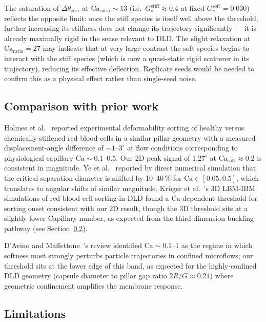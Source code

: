 \documentclass[11pt,a4paper]{article}
\begin{document}
The saturation of $\Delta\theta_{\text{corr}}$ at
$\mathrm{Ca}_{\text{ratio}} \sim 13$ (i.e.\ $G_s^{\text{stiff}}
\approx 0.4$ at fixed $G_s^{\text{soft}} = 0.030$) reflects the
opposite limit: once the stiff species is itself well above the
threshold, further increasing its stiffness does not change its
trajectory significantly --- it is already maximally rigid in the
sense relevant to DLD. The slight relaxation at
$\mathrm{Ca}_{\text{ratio}} = 27$ may indicate that at very large
contrast the soft species begins to interact with the stiff
species (which is now a quasi-static rigid scatterer in its
trajectory), reducing its effective deflection. Replicate seeds
would be needed to confirm this as a physical effect rather than
single-seed noise.

\subsection{Comparison with prior work}
\label{sec:disc-lit}

Holmes et al.~\citep{holmes2014separation} reported experimental
deformability sorting of healthy versus chemically-stiffened red
blood cells in a similar pillar geometry with a measured
displacement-angle difference of $\sim 1$--$3^\circ$ at flow
conditions corresponding to physiological capillary
$\mathrm{Ca} \sim 0.1$--$0.5$. Our 2D peak signal of $1.27^\circ$
at $\mathrm{Ca}_{\text{soft}} \approx 0.2$ is consistent in
magnitude. Ye et al.~\citep{ye2014effects} reported by direct
numerical simulation that the critical separation diameter is
shifted by 10--40\,\% for $\mathrm{Ca} \in [0.05, 0.5]$, which
translates to angular shifts of similar magnitude.
Kr{\"u}ger et al.~\citep{kruger2014deformability}'s 3D LBM-IBM
simulations of red-blood-cell sorting in DLD found a
$\mathrm{Ca}$-dependent threshold for sorting onset consistent
with our 2D result, though the 3D threshold sits at a slightly
lower Capillary number, as expected from the third-dimension
buckling pathway (see Section~\ref{sec:disc-limits}).

D'Avino and Maffettone~\citep{davino2015particle}'s review
identified $\mathrm{Ca} \sim 0.1$--$1$ as the regime in which
softness most strongly perturbs particle trajectories in confined
microflows; our threshold sits at the lower edge of this band, as
expected for the highly-confined DLD geometry (capsule diameter to
pillar gap ratio $2R/G \approx 0.21$) where geometric
confinement amplifies the membrane response.

\subsection{Limitations}
\label{sec:disc-limits}
\end{document}
